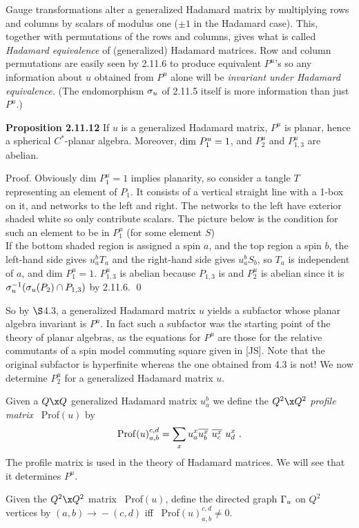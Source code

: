Gauge transformations alter a generalized Hadamard matrix by
multiplying rows and columns by scalars of modulus one ($\pm 1$ in
the Hadamard case). This, together with permutations of the rows
and columns, gives what is called {\it Hadamard equivalence} of
(generalized) Hadamard matrices. Row and column permutations
are easily seen by
2.11.6 to produce equivalent $P^u$'s so any information about $u$
obtained from $P^u$ alone will be {\it invariant under  Hadamard
equivalence.} (The endomorphism $\sigma_u$ of 2.11.5 itself is more
information than just $P^u$.)

\bs\ni
{\bf Proposition 2.11.12} If $u$ is a generalized Hadamard
matrix, $P^u$ is planar, hence a spherical $C^*$-planar algebra.
Moreover, ${\op{dim}} \ P^u_1=1$, and $P^u_2$ and $P^u_{1,3}$ are
abelian.

\bs
{\sc Proof.} Obviously dim $P^u_1=1$ implies planarity, so
consider a tangle $T$ representing an element of $P_1$. It consists
of a vertical straight line with a 1-box on it, and networks to the
left and right. The networks to the left have exterior shaded white
so only contribute scalars. The picture below is the condition for
such an element to be in  $P^u_1$ (for some element $S$)
\[
	
\]
\ni If the bottom shaded region is assigned a spin $a$, and the top
region a spin $b$, the left-hand side gives $u^b_aT_a$ and the
right-hand side gives $u^b_aS_b$, so $T_a$ is independent of $a$,
and dim  $P^u_1=1$.  $P^u_{1,3}$ is abelian because $P_{1,3}$ is
and $P^u_2$ is abelian since it is $\sigma^{-1}_u(\sigma_u(P_2)\cap P_{1,3})$
by 2.11.6. \qed

\bs So by $\S$4.3, a generalized Hadamard matrix $u$ yields a
subfactor whose planar algebra invariant is $P^u$. In fact such a
subfactor was the starting point of the theory of planar algebras, as the equations for $P^u$ are
those for the relative commutants of a spin model commuting square
given in [JS]. Note that the original subfactor is
hyperfinite whereas the one obtained from 4.3 is not! We now
determine $P^u_2$ for a generalized Hadamard matrix $u$.

 Given a $Q\x Q$
generalized Hadamard matrix $u^b_a$ we define the $Q^2\x Q^2$ {\it
profile matrix} \ Prof$(u)$ by
$$
{\bf\rm{Prof}}(u)^{c,d}_{a,b} =\sum_x
u^x_a \overline{u^x_b} \ \overline{u^x_c} \ u^x_d \ .
$$
The profile matrix is used in the theory of Hadamard matrices.
We will see that it determines $P^u$.

 Given the $Q^2\x Q^2$
matrix \ Prof$(u)$, define the directed graph $\Gamma_u$ on $Q^2$
vertices by $(a,b)\rightarrow\!\!\!- (c,d)$ iff \
Prof$(u)^{c,d}_{a,b}\neq 0$.

